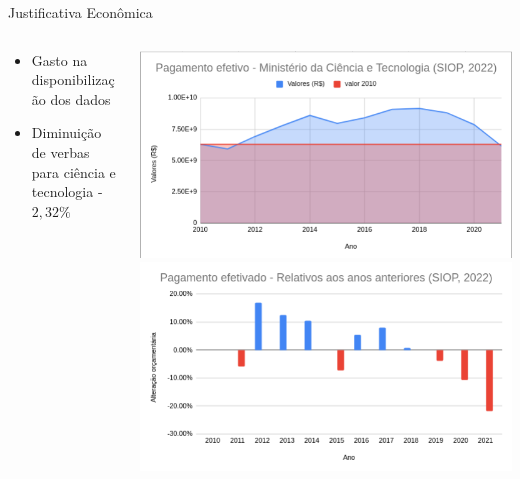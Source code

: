 \documentclass[10pt,brazil]{beamer}
\theoremstyle{definition}
\begin{document}
\begin{frame}{Justificativa Econômica}
  \begin{columns}
    \begin{column}{0.5\textwidth}
              \begin{itemize}
                \item Gasto na disponibilização dos dados
                \item Diminuição de verbas para ciência e tecnologia -$2,32\%$
      \end{itemize}
    \end{column}
    \begin{column}{0.5\textwidth}  %
      \begin{center}
        \includegraphics[width=1\textwidth]{orcamento.png}
        \includegraphics[width=1\textwidth]{variacaoorcamentaria.png}
      \end{center}
    \end{column}
  \end{columns}
\end{frame}
\end{document}
